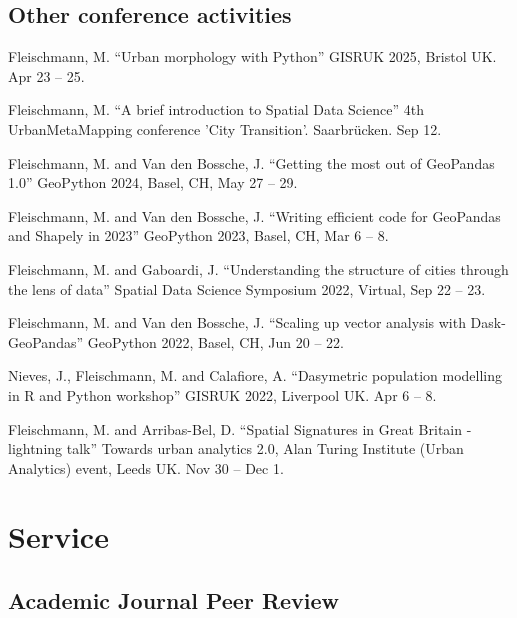 \documentclass[12pt,a4paper]{report}
\begin{document}
    \subsection*{Other conference activities}

    \begin{tablist}

        \item[2025] \tab{}Fleischmann, M. \enquote{Urban morphology with Python} GISRUK 2025, Bristol UK. Apr 23 -- 25.
        \item[2024] \tab{}Fleischmann, M. \enquote{A brief introduction to Spatial Data Science} 4th UrbanMetaMapping conference 'City Transition'. Saarbrücken. Sep 12.
        \item[2023] \tab{}Fleischmann, M. and Van den Bossche, J. \enquote{Getting the most out of GeoPandas 1.0} GeoPython 2024, Basel, CH, May 27 -- 29.
        \item[2023] \tab{}Fleischmann, M. and Van den Bossche, J. \enquote{Writing efficient code for GeoPandas and Shapely in 2023} GeoPython 2023, Basel, CH, Mar 6 -- 8.
        \item[2022] \tab{}Fleischmann, M. and Gaboardi, J. \enquote{Understanding the structure of cities through the lens of data} Spatial Data Science Symposium 2022, Virtual, Sep 22 -- 23.
        \item[2022] \tab{}Fleischmann, M. and Van den Bossche, J. \enquote{Scaling up vector analysis with Dask-GeoPandas} GeoPython 2022, Basel, CH, Jun 20 -- 22.
        \item[2022] \tab{}Nieves, J., Fleischmann, M. and Calafiore, A. \enquote{Dasymetric population modelling in R and Python workshop} GISRUK 2022, Liverpool UK. Apr 6 -- 8.
        \item[2021] \tab{}Fleischmann, M. and Arribas-Bel, D. \enquote{Spatial Signatures in Great Britain - lightning talk} Towards urban analytics 2.0, Alan Turing Institute (Urban Analytics) event, Leeds UK. Nov 30 -- Dec 1.

    \end{tablist}


    \section*{Service}

    \subsection*{Academic Journal Peer Review}
\end{document}
